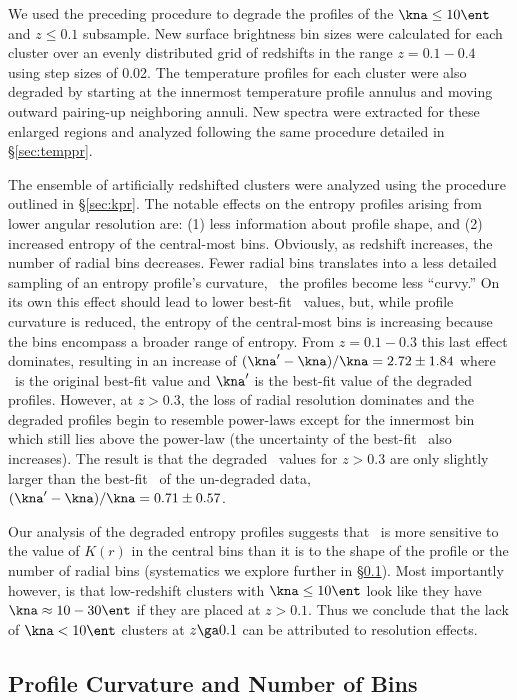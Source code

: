 \documentclass{emulateapj}
\begin{document}
We used the preceding procedure to degrade the profiles of the $\kna
\leq 10 \ent$ and $z \leq 0.1$ subsample. New surface brightness bin
sizes were calculated for each cluster over an evenly distributed grid
of redshifts in the range $z = 0.1-0.4$ using step sizes of 0.02. The
temperature profiles for each cluster were also degraded by starting
at the innermost temperature profile annulus and moving outward
pairing-up neighboring annuli. New spectra were extracted for these
enlarged regions and analyzed following the same procedure detailed in
\S\ref{sec:temppr}.

The ensemble of artificially redshifted clusters were analyzed using
the procedure outlined in \S\ref{sec:kpr}. The notable effects on the
entropy profiles arising from lower angular resolution are: (1) less
information about profile shape, and (2) increased entropy of the
central-most bins. Obviously, as redshift increases, the number of
radial bins decreases. Fewer radial bins translates into a less
detailed sampling of an entropy profile's curvature, \eg\ the profiles
become less ``curvy.'' On its own this effect should lead to lower
best-fit \kna\ values, but, while profile curvature is reduced, the
entropy of the central-most bins is increasing because the bins
encompass a broader range of entropy. From $z = 0.1-0.3$ this last
effect dominates, resulting in an increase of $\dkna = 2.72 \pm 1.84$
where \kna\ is the original best-fit value and $\kna^{\prime}$ is the
best-fit value of the degraded profiles. However, at $z > 0.3$, the
loss of radial resolution dominates and the degraded profiles begin to
resemble power-laws except for the innermost bin which still lies
above the power-law (the uncertainty of the best-fit \kna\ also
increases). The result is that the degraded \kna\ values for $z > 0.3$
are only slightly larger than the best-fit \kna\ of the un-degraded
data, $\dkna = 0.71 \pm 0.57$.

Our analysis of the degraded entropy profiles suggests that \kna\ is
more sensitive to the value of $K(r)$ in the central bins than it is
to the shape of the profile or the number of radial bins (systematics
we explore further in \S\ref{sec:curve}). Most importantly however, is
that low-redshift clusters with $\kna \le 10 \ent$ look like they have
$\kna \approx 10-30 \ent$ if they are placed at $z > 0.1$. Thus we
conclude that the lack of $\kna < 10 \ent$ clusters at $z \ga 0.1$ can
be attributed to resolution effects.

\subsection{Profile Curvature and Number of Bins}
\label{sec:curve}
\end{document}
